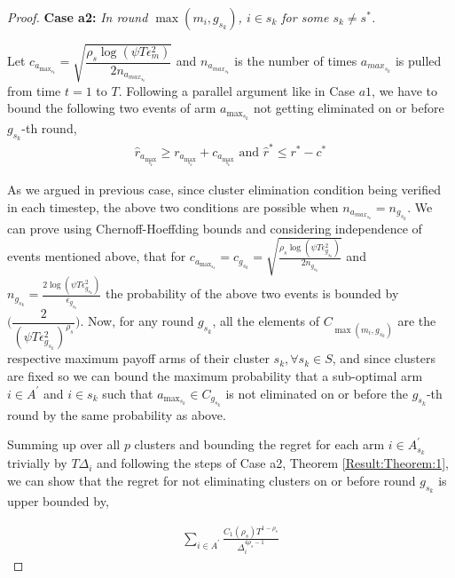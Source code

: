 \begin{proof}
\textbf{Case a2:} \textit{In round $\max(m_{i},g_{s_{k}})$, ${i} \in s_k$ for some $s_k \ne s^{*}$.}

Let $c_{a_{\max_{s_{k}}}}=\sqrt{\dfrac{\rho_{s}\log{(\psi T\epsilon_{m}^{2})}}{2 n_{a_{max_{s_{k}}}}}}$ and $n_{a_{max_{s_{k}}}}$ is the number of times $a_{max_{s_{k}}}$ is pulled from time $t=1$ to $T$. Following a parallel argument like in Case $a1$, we have to bound the following two events of arm $a_{\max_{s_{k}}}$ not getting eliminated on or before $g_{s_{k}}$-th round,
\begin{align*}
  \hat{r}_{a_{\max_{s_{k}}}} \geq r_{a_{\max_{s_{k}}}} +c_{a_{\max_{s_{k}}}} \text{ and } \hat{r}^{*} \leq r^{*} -c^{*}  
\end{align*} 

As we argued in previous case, since cluster elimination condition being verified in each timestep, the above two conditions are possible when $n_{a_{max_{s_{k}}}} = n_{g_{s_{k}}}$. We can prove using Chernoff-Hoeffding bounds and considering independence of events mentioned above, that for $c_{a_{\max_{s_{k}}}} = c_{g_{s_{k}}}=\sqrt{\frac{\rho_{s} \log (\psi T\epsilon_{g_{s_{k}}}^{2})}{2 n_{g_{s_{k}}}}}$ and  $n_{g_{s_{k}}}=\frac{2\log{(\psi T\epsilon_{g_{s_{k}}}^{2})}}{\epsilon_{g_{s_{k}}}}$ the probability of the above two events is bounded by $\bigg(\dfrac{2}{(\psi  T\epsilon_{g_{s_{k}}}^{2})^{\rho_{s}}}\bigg)$.
  Now, for any round $g_{s_{k}}$, all the elements of $C_{\max(m_{i},g_{s_{k}})}$ are the respective maximum payoff arms of their cluster $s_{k}, \forall s_{k}\in S$, and since clusters are fixed so we can bound the maximum probability that a sub-optimal arm ${i}\in A^{'}$  and ${i}\in s_{k}$ such that $a_{\max_{s_{k}}}\in C_{g_{s_{k}}}$ is not eliminated on or before the $g_{s_{k}}$-th round by the same probability as above. 

Summing up over all $p$ clusters and bounding the regret for each arm $i\in A_{s_{k}}^{'}$ trivially by $T\Delta_{i}$ and following the steps of Case a2, Theorem \ref{Result:Theorem:1}, we can show that the regret for not eliminating clusters on or before round $g_{s_{k}}$ is upper bounded by,

\begin{align*}
\sum_{i\in A^{'}}\frac{C_{1}(\rho_{s})T^{1-\rho_{s}}}{\Delta_{i}^{4\rho_{s}-1}}
\end{align*}


\end{proof}
